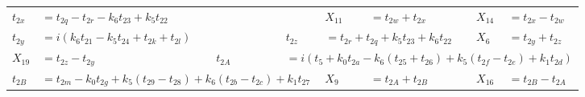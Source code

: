 \begin{tabular}{|p{4.3pt}l|p{4.3pt}l|p{4.3pt}l|p{4.3pt}l|p{4.3pt}l|}
$t_{2x} $ &\multicolumn{5}{l|}{$= t_{2q} - t_{2r} - k_6t_{23} + k_5t_{22}$} & $X_{11} $ &$= t_{2w} + t_{2x}$ & $X_{14} $ &$= t_{2x} - t_{2w}$\\ 
$t_{2y} $ &\multicolumn{3}{l|}{$= i(k_6t_{21} - k_5t_{24} + t_{2k} + t_{2l})$} & $t_{2z} $ &\multicolumn{3}{l|}{$= t_{2r} + t_{2q} + k_5t_{23} + k_6t_{22}$} & $X_6 $ &$= t_{2y} + t_{2z}$\\ 
$X_{19} $ &$= t_{2z} - t_{2y}$ & $t_{2A} $ &\multicolumn{7}{l|}{$= i(t_5 + k_0t_{2a} - k_6(t_{25} + t_{26}) + k_5(t_{2f} - t_{2e}) + k_1t_{2d})$}\\ 
$t_{2B} $ &\multicolumn{5}{l|}{$= t_{2m} - k_0t_{2g} + k_5(t_{29} - t_{28}) + k_6(t_{2b} - t_{2c}) + k_1t_{27}$} & $X_9 $ &$= t_{2A} + t_{2B}$ & $X_{16} $ &$= t_{2B} - t_{2A}$\\ 
\bottomrule\end{tabular}

